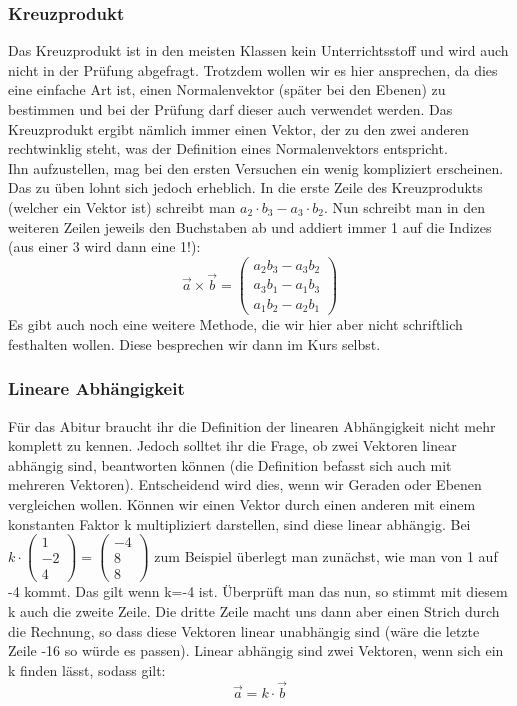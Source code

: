	\subsubsection{Kreuzprodukt}
		Das Kreuzprodukt ist in den meisten Klassen kein Unterrichtsstoff und wird
		auch nicht in der Prüfung abgefragt. Trotzdem wollen wir es hier ansprechen,
		da dies eine einfache Art ist, einen Normalenvektor (später bei den Ebenen) zu
		bestimmen und bei der Prüfung darf dieser auch verwendet werden. Das
		Kreuzprodukt ergibt nämlich immer einen Vektor, der zu den zwei anderen
		rechtwinklig steht, was der Definition eines Normalenvektors entspricht.\\
		Ihn aufzustellen, mag bei den ersten Versuchen ein wenig kompliziert
		erscheinen. Das zu üben lohnt sich jedoch erheblich. In die erste Zeile des
		Kreuzprodukts (welcher ein Vektor ist) schreibt man \(a_2\cdot b_3-a_3\cdot
		b_2\). Nun schreibt man in den weiteren Zeilen jeweils den Buchstaben ab und
		addiert immer 1 auf die Indizes (aus einer 3 wird dann eine 1!):
		\[\vec{a} \times \vec{b}=
		\begin{pmatrix}
		 a_2b_3-a_3b_2\\
		 a_3b_1-a_1b_3\\
		 a_1b_2-a_2b_1
		\end{pmatrix}\]
		Es gibt auch noch eine weitere Methode, die wir hier aber nicht schriftlich
		festhalten wollen. Diese besprechen wir dann im Kurs selbst.

	\subsubsection{Lineare Abhängigkeit}
		Für das Abitur braucht ihr die Definition der linearen Abhängigkeit nicht mehr
		komplett zu kennen. Jedoch solltet ihr die Frage, ob zwei Vektoren linear
		abhängig sind, beantworten können (die Definition befasst sich auch mit
		mehreren Vektoren). Entscheidend wird dies, wenn wir Geraden oder Ebenen
		vergleichen wollen. Können wir einen Vektor durch einen anderen mit einem
		konstanten Faktor k multipliziert darstellen, sind diese linear abhängig. Bei
		\(k\cdot \begin{pmatrix} 1\\
		 -2\\
		 4
		\end{pmatrix}=\begin{pmatrix}
		 -4\\
		 8\\
		 8
		\end{pmatrix}\)
		zum Beispiel überlegt man zunächst, wie man von 1 auf -4 kommt. Das gilt wenn
		k=-4 ist. Überprüft man das nun, so stimmt mit diesem k auch die zweite Zeile.
		Die dritte Zeile macht uns dann aber einen Strich durch die Rechnung, so dass
		diese Vektoren linear unabhängig sind (wäre die letzte Zeile -16 so würde es
		passen). Linear abhängig sind zwei Vektoren, wenn sich ein k finden lässt,
		sodass gilt:
		\[\vec{a}=k\cdot \vec{b}\]
